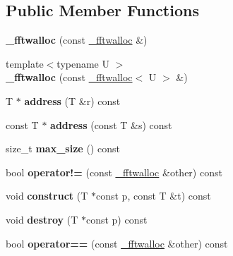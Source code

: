 \subsection*{Public Member Functions}
\begin{DoxyCompactItemize}
\item 
\mbox{\label{class__fftwalloc_a54f95b42717abce667c3d6a79f7d3f3c}} 
{\bfseries \+\_\+fftwalloc} (const \hyperlink{class__fftwalloc}{\+\_\+fftwalloc} \&)
\item 
\mbox{\label{class__fftwalloc_a00107cb398eb5f31c06acfb4c6174aa2}} 
{\footnotesize template$<$typename U $>$ }\\{\bfseries \+\_\+fftwalloc} (const \hyperlink{class__fftwalloc}{\+\_\+fftwalloc}$<$ U $>$ \&)
\item 
\mbox{\label{class__fftwalloc_a4e380a29022678dbb6bb87ec37ebc648}} 
T $\ast$ {\bfseries address} (T \&r) const
\item 
\mbox{\label{class__fftwalloc_abdf36ae342931e7152886d998b0b51ec}} 
const T $\ast$ {\bfseries address} (const T \&s) const
\item 
\mbox{\label{class__fftwalloc_a7eda8df0b9b1c8f414ccdaf86bf30f53}} 
size\+\_\+t {\bfseries max\+\_\+size} () const
\item 
\mbox{\label{class__fftwalloc_a31f9e314e5aff021d1b496a8f9980c62}} 
bool {\bfseries operator!=} (const \hyperlink{class__fftwalloc}{\+\_\+fftwalloc} \&other) const
\item 
\mbox{\label{class__fftwalloc_a35fe8abd389c2f24b158865b0430b707}} 
void {\bfseries construct} (T $\ast$const p, const T \&t) const
\item 
\mbox{\label{class__fftwalloc_a4924626f2f99a3c948bd2ebc7b0e8672}} 
void {\bfseries destroy} (T $\ast$const p) const
\item 
\mbox{\label{class__fftwalloc_a8278c8ba3d522669780755530c040f91}} 
bool {\bfseries operator==} (const \hyperlink{class__fftwalloc}{\+\_\+fftwalloc} \&other) const
\item 

\end{DoxyCompactItemize}
